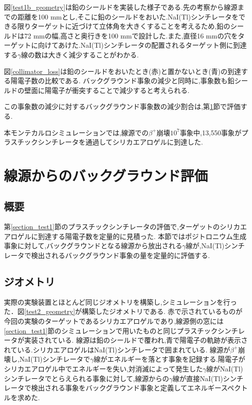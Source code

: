 図\ref{test1b_geometry}は鉛のシールドを実装した様子である.先の考察から線源までの距離を100 mmとし,そこに鉛のシールドをおいた.NaI(Tl)シンチレータをできる限りターゲットに近づけて立体角を大きくすることを考えるため,鉛のシールドは72 mmの幅,高さと奥行きを100 mmで設計した.また,直径16 mmの穴をターゲットに向けてあけた.NaI(Tl)シンチレータの配置されるターゲット側に到達する$\gamma$線の数は大きく減少することがわかる.

図\ref{collimator_loss}は鉛のシールドをおいたとき(赤)と置かないとき(青)の到達する陽電子数の比較である.
バックグラウンド事象の減少と同時に,事象数も鉛シールドの壁面に陽電子が衝突することで減少すると考えられる.

この事象数の減少に対するバックグラウンド事象数の減少割合は,第\ref{section_test2}節で評価する.

本モンテカルロシミュレーションでは,線源での$\beta^+$崩壊$10^7$事象中,13,550事象がプラスチックシンチレータを通過してシリカエアロゲルに到達した.



\section{線源からのバックグラウンド評価}
\label{section_test2}

\subsection{概要}
第\ref{section_test1}節のプラスチックシンチレータの評価で,ターゲットのシリカエアロゲルに到達する陽電子数を定量的に見積った.
本節ではポジトロニウム生成事象に対して,バックグラウンドとなる線源から放出される$\gamma$線が,NaI(Tl)シンチレータで検出されるバックグラウンド事象の量を定量的に評価する.


\subsection{ジオメトリ}
実際の実験装置とほとんど同じジオメトリを構築し,シミュレーションを行った．図\ref{test2_geometry}が構築したジオメトリである.
赤で示されているものが今回の実験のターゲットであるシリカエアロゲルであり,線源側の窓には\ref{section_test1}節のシミュレーションで用いたものと同じプラスチックシンチレータが実装されている.
線源は鉛のシールドで覆われ,青で陽電子の軌跡が表示されている.シリカエアロゲルはNaI(Tl)シンチレータで囲まれている.
線源が$\beta^+$崩壊し,NaI(Tl)シンチレータで$\gamma$線がエネルギーを落とす事象を記録する.陽電子がシリカエアロゲル中でエネルギーを失い,対消滅によって発生した$\gamma$線がNaI(Tl)シンチレータでとらえられる事象に対して,線源からの$\gamma$線が直接NaI(Tl)シンチレータで検出される事象をバックグラウンド事象と定義してエネルギースペクトルを求めた.

